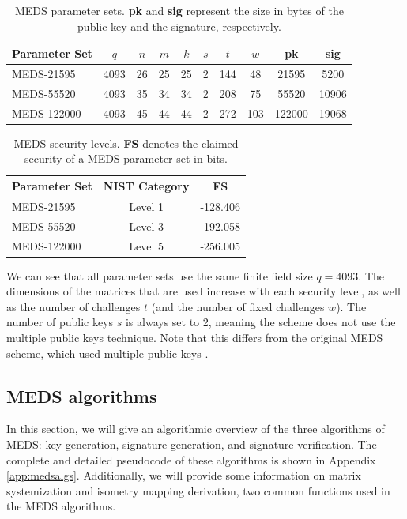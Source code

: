 \documentclass[11pt,a4paper]{report}
\theoremstyle{definition}
\begin{document}
\begin{table}
  \centering
  \begin{tabular}{lccccccccc}
    \toprule
    \textbf{Parameter Set} & \textbf{$q$} & \textbf{$n$} & \textbf{$m$} & \textbf{$k$} & \textbf{$s$} & \textbf{$t$} & \textbf{$w$} & \textbf{pk} & \textbf{sig} \\
    \midrule
    MEDS-21595 & 4093 & 26 & 25 & 25 & 2 & 144 & 48 & 21595 & 5200 \\
    MEDS-55520 & 4093 & 35 & 34 & 34 & 2 & 208 & 75 & 55520 & 10906 \\
    MEDS-122000 & 4093 & 45 & 44 & 44 & 2 & 272 & 103 & 122000 & 19068 \\
    \bottomrule
  \end{tabular}
  \caption{MEDS parameter sets. \textbf{pk} and \textbf{sig} represent the size in bytes of the public key and the signature, respectively.}
  \label{tab:medsparametersets}
\end{table}

\begin{table}
  \centering
  \begin{tabular}{lcc}
    \toprule
    \textbf{Parameter Set} & \textbf{NIST Category} & \textbf{FS} \\
    \midrule
    MEDS-21595 & Level 1 & -128.406 \\
    MEDS-55520 & Level 3 & -192.058 \\
    MEDS-122000 & Level 5 & -256.005 \\
    \bottomrule
  \end{tabular}
  \caption{MEDS security levels. \textbf{FS} denotes the claimed security of a MEDS parameter set in bits.}
  \label{tab:medssecuritylevels}
\end{table}

We can see that all parameter sets use the same finite field size $q = 4093$. The dimensions of the matrices that are used increase with each security level, as well as the number of challenges $t$ (and the number of fixed challenges $w$). The number of public keys $s$ is always set to 2, meaning the scheme does not use the multiple public keys technique. Note that this differs from the original MEDS scheme, which used multiple public keys \cite{chou2023meds}.

\subsection{MEDS algorithms}
\label{sec:medsalgorithms}
In this section, we will give an algorithmic overview of the three algorithms of MEDS: key generation, signature generation, and signature verification. The complete and detailed pseudocode of these algorithms is shown in Appendix \ref{app:medsalgs}. Additionally, we will provide some information on matrix systemization and isometry mapping derivation, two common functions used in the MEDS algorithms.
\end{document}
